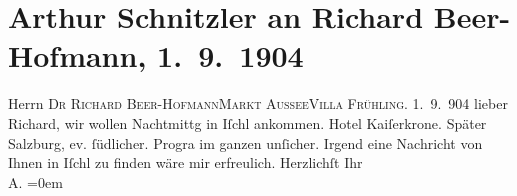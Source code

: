 

         
         \renewcommand{\erwaehntePersonen}{Personen: Richard Beer-Hofmann}
         \renewcommand{\erwaehnteOrte}{Orte: Bad Aussee, Hotel Kaiserkrone, Salzburg, Südbahnhotel, Villa Frühling, Wien, XVIII., Währing}
         \renewcommand{\erwaehnteWerke}{}
               \section[Arthur Schnitzler an Richard Beer-Hofmann, 1. 9. 1904]{ Arthur Schnitzler an Richard Beer-Hofmann, 1. 9. 1904}\nopagebreak{}\rehead{ }\begin{ledgroupsized}[t]{13cm}\normalsize\beginnumbering \toendnotes[C]{\smallbreak\pagebreak[2]} 
\toendnotes[C]{\smallbreak}\pstart{}{\pb}Herrn \textsc{Dr Richard
                     Beer-Hofmann}\pend{}\pstart{}\textsc{Markt Aussee}\pend{}\pstart{}\textsc{Villa Frühling}.\pend{}{\bigskip}\pstart
           \raggedleft{}{\pb}1. 9. 904\pend
           \pstart
           lieber Richard, wir wollen \label{K_L01433-1v}\label{K_L01433-1h}{ }Nachtmittg in Iſchl ankommen. Hotel Kaiſerkrone. Später Salzburg, ev. ſüdlicher. Progra{\geminationm} im
               ganzen unſicher. Irgend eine Nachricht von Ihnen in Iſchl zu finden wäre mir
               erfreulich.\pend
           \pstart
           Herzlichſt Ihr{\\[\baselineskip]}\spacefill\mbox{A.}\pend
           \leftskip=0em{}
         
         \endnumbering{}\end{ledgroupsized}  \newcommand{\dateiname}{L01433}\newcommand{\titel}{Arthur Schnitzler an Richard Beer-Hofmann, 1. 9. 1904}\newcommand{\editorInnen}{Martin Anton Müller und Gerd-Hermann Susen}
      